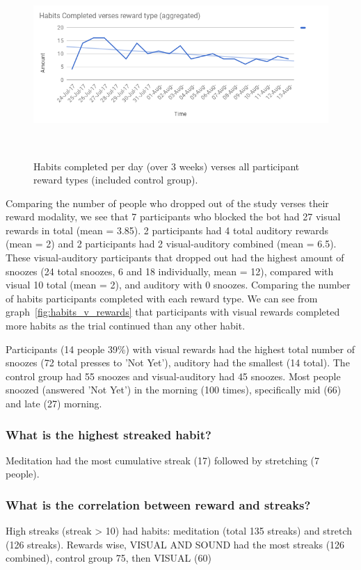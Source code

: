 \documentclass{scaffold/sigchi}
\begin{document}
\begin{figure}
  \centering
  \includegraphics[width=1\columnwidth]{figures/allhabitscompleted-v-rewards.png}
  \caption{Habits completed per day (over 3 weeks) verses all participant reward types (included control group).}~\label{fig:allhabits_v_rewards}
\end{figure}

Comparing the number of people who dropped out of the study verses their reward modality, we see that 7 participants who blocked the bot had 27 visual rewards in total (mean = 3.85). 2 participants had 4 total auditory rewards (mean = 2) and 2 participants had 2 visual-auditory combined (mean = 6.5). These visual-auditory participants that dropped out had the highest amount of snoozes (24 total snoozes, 6 and 18 individually, mean = 12), compared with visual 10 total (mean = 2), and auditory with 0 snoozes.\newline
\newline
Comparing the number of habits participants completed with each reward type. We can see from graph~\ref{fig:habits_v_rewards} that participants with visual rewards completed more habits as the trial continued than any other habit.  

Participants (14 people 39\%) with visual rewards had the highest total number of snoozes (72 total presses to 'Not Yet'), auditory had the smallest (14 total). The control group had 55 snoozes and visual-auditory had 45 snoozes. Most people snoozed (answered 'Not Yet') in the morning (100 times), specifically mid (66) and late (27) morning.

\subsubsection{What is the highest streaked habit?}
Meditation had the most cumulative streak (17) followed by stretching (7 people).

\subsubsection{What is the correlation between reward and streaks?}
High streaks (streak > 10) had habits: meditation (total 135 streaks) and stretch (126 streaks). Rewards wise, VISUAL AND SOUND had the most streaks (126 combined), control group 75, then VISUAL (60)
\end{document}
